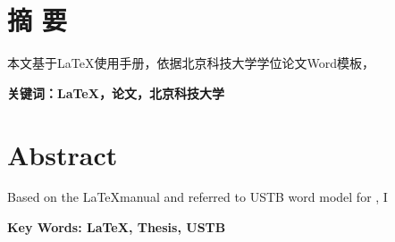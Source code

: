 
\chapter*{ 摘 \space 要 }
本文基于\LaTeX 使用手册，依据北京科技大学\degreecn 学位论文Word模板，


\vskip 30bp
\heiti {}
\textbf{关键词：\LaTeX ，\degreecn 论文，北京科技大学}




\chapter*{ Abstract }
Based on the \LaTeX manual and referred to USTB word model for \degreeen, I

\vskip 30bp
\textbf{Key Words: \LaTeX, \degreeen Thesis, USTB}

